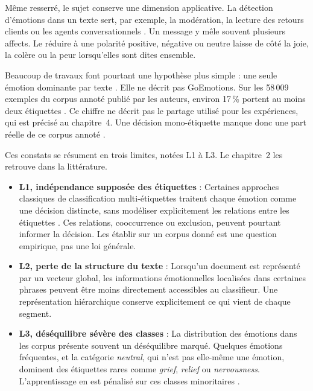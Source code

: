 Même resserré, le sujet conserve une dimension applicative. La détection d'émotions
dans un texte sert, par exemple, la modération, la lecture des retours
clients ou les agents conversationnels
\cite{minaee2021textcls,mohammad2020sentiment}. Un message y mêle souvent
plusieurs affects. Le réduire à une polarité positive, négative ou neutre
\cite{pang2008} laisse de côté la joie, la colère ou la peur lorsqu'elles
sont dites ensemble.

Beaucoup de travaux font pourtant une hypothèse plus simple : une seule
émotion dominante par texte \cite{seyeditabari2018}. Elle ne décrit pas
GoEmotions. Sur les 58\,009 exemples du corpus annoté publié par les
auteurs, environ 17\,\% portent au moins deux étiquettes
\cite{demszky2020}. Ce chiffre ne décrit pas le partage utilisé pour
les expériences, qui est précisé au chapitre~4. Une décision
mono-étiquette manque donc une part réelle de ce corpus annoté
\cite{zhang2014multilabel,read2019classifier}.

Ces constats se résument en trois limites, notées L1 à L3. Le chapitre~2
les retrouve dans la littérature.

\begin{itemize}
\item \textbf{L1, indépendance supposée des étiquettes} : Certaines approches
  classiques de classification multi-étiquettes traitent chaque émotion
  comme une décision distincte, sans modéliser explicitement les relations
  entre les étiquettes \cite{zhang2014multilabel,read2019classifier}.
  Ces relations, cooccurrence ou exclusion, peuvent pourtant informer la
  décision. Les établir sur un corpus donné est une question empirique,
  pas une loi générale.
\item \textbf{L2, perte de la structure du texte} : Lorsqu'un document est
  représenté par un vecteur global, les informations émotionnelles
  localisées dans certaines phrases peuvent être moins directement
  accessibles au classifieur. Une représentation hiérarchique conserve
  explicitement ce qui vient de chaque segment.
\item \textbf{L3, déséquilibre sévère des classes} : La distribution des
  émotions dans les corpus présente souvent un déséquilibre marqué.
  Quelques émotions fréquentes, et la catégorie \emph{neutral}, qui n'est
  pas elle-même une émotion, dominent des étiquettes rares comme
  \emph{grief}, \emph{relief} ou \emph{nervousness}. L'apprentissage en
  est pénalisé sur ces classes minoritaires
  \cite{lin2017focal,chawla2002smote}.
\end{itemize}

